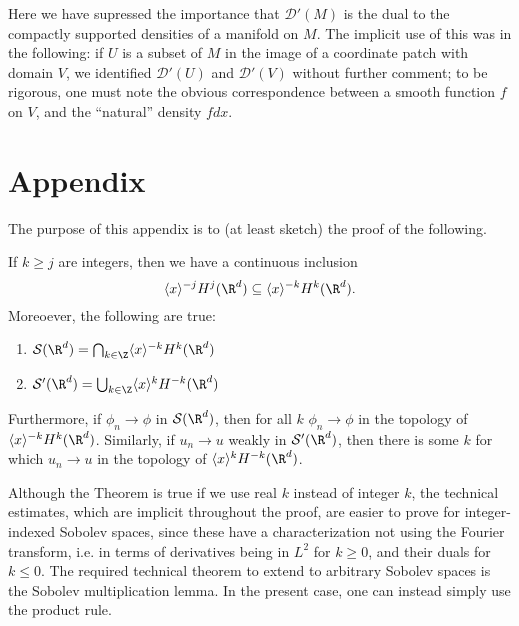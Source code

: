 \documentclass[12pt]{article}
\begin{document}
Here we have supressed the importance that $\mathcal D'(M)$ is the dual to the compactly supported densities of a manifold on $M$. The implicit use of this was in the following: if $U$ is a subset of $M$ in the image of a coordinate patch with domain $V$, we identified $\mathcal D'(U)$ and $\mathcal D'(V)$ without further comment; to be rigorous, one must note the obvious correspondence between a smooth function $f$ on $V$, and the ``natural'' density $fdx$.

\appendix
\section{Appendix}
The purpose of this appendix is to (at least sketch) the proof of the following.
\begin{thm}If $k \geq j$ are integers, then we have a continuous inclusion
\[\langle x \rangle^{-j} H^{j}(\R^d) \subseteq \langle x \rangle^{-k} H^{k}(\R^d).\] Moreoever, the following are true:\begin{enumerate}[label = (\roman*)]
\item $\mathcal S(\R^d) = \bigcap_{k \in \Z} \langle x \rangle^{-k}H^k(\R^d)$
\item $\mathcal S'(\R^d) = \bigcup_{k \in \Z} \langle x \rangle^{k}H^{-k}(\R^d)$
\end{enumerate}
Furthermore, if $\phi_n \to \phi$ in $\mathcal S(\R^d)$, then for all $k$ $\phi_n \to \phi$ in the topology of $\langle x \rangle^{-k}H^k(\R^d)$. Similarly, if $u_n \to u$ weakly in $\mathcal S'(\R^d)$, then there is some $k$ for which $u_n \to u$ in the topology of $\langle x \rangle^{k}H^{-k}(\R^d)$.\end{thm}
\begin{rk}Although the Theorem is true if we use real $k$ instead of integer $k$, the technical estimates, which are implicit throughout the proof, are easier to prove for integer-indexed Sobolev spaces, since these have a characterization not using the Fourier transform, i.e. in terms of derivatives being in $L^2$ for $k \geq 0$, and their duals for $k \leq 0$. The required technical theorem to extend to arbitrary Sobolev spaces is the Sobolev multiplication lemma. In the present case, one can instead simply use the product rule.\end{rk}
\end{document}
